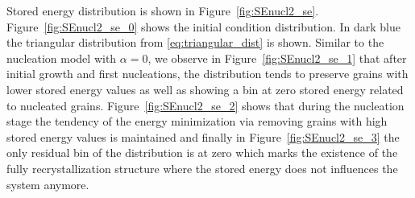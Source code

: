 Stored energy distribution is shown in Figure~\ref{fig:SEnucl2_se}.
Figure~\ref{fig:SEnucl2_se_0} shows the initial condition distribution. 
In dark blue the triangular distribution from \eqref{eq:triangular_dist} is shown. Similar to the nucleation model with $\alpha = 0$, we observe in Figure~\ref{fig:SEnucl2_se_1} that after initial growth and first nucleations, the distribution tends to preserve grains with lower stored energy values as well as showing a bin at zero stored energy related to nucleated grains.
Figure~\ref{fig:SEnucl2_se_2} shows that during the nucleation stage the tendency of the energy minimization via removing grains with high stored energy values is maintained and finally in Figure~\ref{fig:SEnucl2_se_3} the only residual bin of the distribution is at zero which marks the existence of the fully recrystallization structure where the stored energy does not influences the system anymore.


